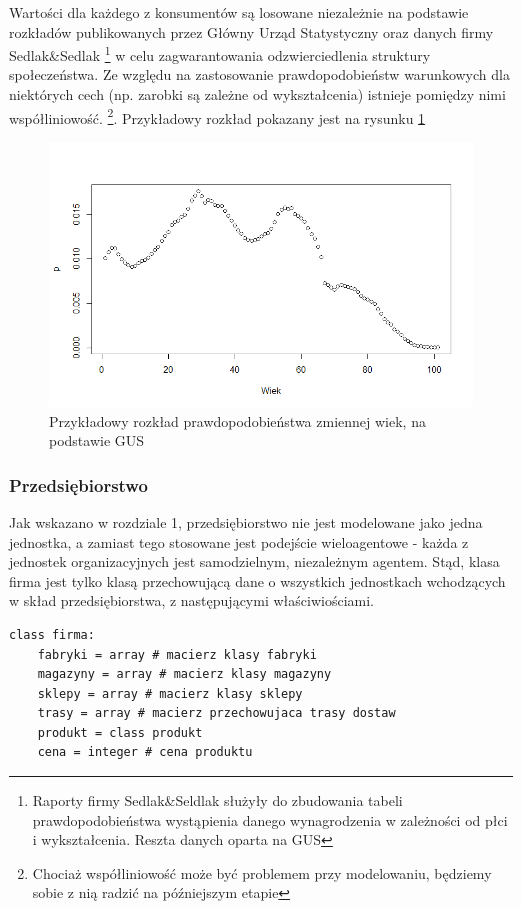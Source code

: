 \documentclass{article}
\begin{document}
Wartości dla każdego z konsumentów są losowane niezależnie na podstawie rozkładów publikowanych przez Główny Urząd Statystyczny oraz danych firmy Sedlak\&Sedlak \footnote{Raporty firmy Sedlak\&Seldlak służyły do zbudowania tabeli prawdopodobieństwa wystąpienia danego wynagrodzenia w zależności od płci i wykształcenia. Reszta danych oparta na GUS} w celu zagwarantowania odzwierciedlenia struktury społeczeństwa. Ze względu na zastosowanie prawdopodobieństw warunkowych dla niektórych cech (np. zarobki są zależne od wykształcenia) istnieje pomiędzy nimi współliniowość. \footnote{Chociaż współliniowość może być problemem przy modelowaniu, będziemy sobie z nią radzić na późniejszym etapie}. Przykładowy rozkład pokazany jest na rysunku \ref{fig:wiek}

\begin{figure}
  \centering
\includegraphics[width=\linewidth]{pictures/rplot01.png}
  \caption{Przykładowy rozkład prawdopodobieństwa zmiennej wiek, na podstawie GUS}
  \label{fig:wiek}
\end{figure}


\subsubsection{Przedsiębiorstwo}

Jak wskazano w rozdziale 1, przedsiębiorstwo nie jest modelowane jako jedna jednostka, a zamiast tego stosowane jest podejście wieloagentowe - każda z jednostek organizacyjnych jest samodzielnym, niezależnym agentem. Stąd, klasa firma jest tylko klasą przechowującą dane o wszystkich jednostkach wchodzących w skład przedsiębiorstwa, z następującymi właściwiościami.

\begin{lstlisting}[frame=single]  
class firma:   
	fabryki = array # macierz klasy fabryki
	magazyny = array # macierz klasy magazyny
	sklepy = array # macierz klasy sklepy
	trasy = array # macierz przechowujaca trasy dostaw
	produkt = class produkt 
	cena = integer # cena produktu
\end{lstlisting}
\end{document}
